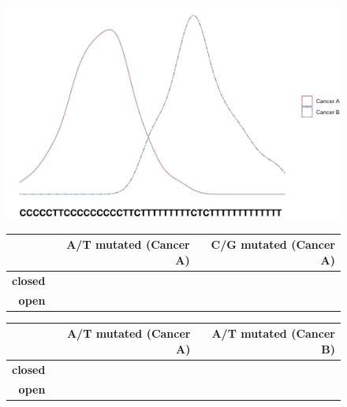 \begin{figure}[h!]
  \begin{minipage}[c]{\textwidth}
    \includegraphics[scale=0.9]{graphics/discussion_gle.pdf}
  \end{minipage}\hfill
  \vspace{1cm}
  
  \begin{minipage}[c]{0.48\textwidth}
  \centering
    \begin{tabulary}{\columnwidth}{rRR}
    \toprule
        & \textbf{A/T mutated (Cancer A)} &  \textbf{C/G mutated (Cancer A)} \\
    \hline
        \textbf{closed} &  &   \\
        \textbf{open} &  &   \\
    \bottomrule
    \end{tabulary}
  \end{minipage}\hfill
  \begin{minipage}[c]{0.48\textwidth}
    \begin{tabulary}{\columnwidth}{rRR}
    \toprule
        & \textbf{A/T mutated (Cancer A)} &  \textbf{A/T mutated (Cancer B)} \\
    \hline
        \textbf{closed} &  &   \\
        \textbf{open} &  &   \\
    \bottomrule
    \end{tabulary}
  \end{minipage}
  \vspace{0.8cm}
  

\end{figure}
